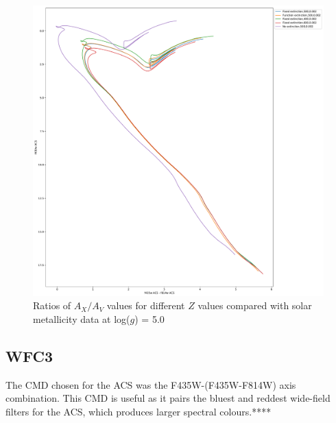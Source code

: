 \documentclass[12pt, a4paper]{report}
\begin{document}
\begin{figure}[h]
\begin{center}
\includegraphics[scale=0.3]{../basti_isochrones_10_13Gyr/Extinction_T50k_FeH0fix_func_f435wACS_f435wACSmf814wACS_500_400_600_Myr_FeH_0p002_ref_noext_Av_1p0.pdf}
\caption{Ratios of $A_{X}/A_{V}$ values for different $Z$ values compared with solar metallicity data at log($g$) = 5.0}
\label{acs_isoc_T50k}
\end{center}
\end{figure}

\subsection{WFC3} \label{WFC3_isoc}

The CMD chosen for the ACS was the F435W-(F435W-F814W) axis combination. This CMD is useful as it pairs the bluest and reddest wide-field filters for the ACS, which produces larger spectral colours.****
\end{document}
